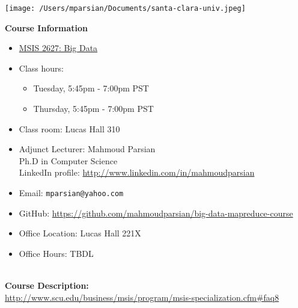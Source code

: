 \documentclass[11pt]{article}
\begin{document}
\texttt{[image: /Users/mparsian/Documents/santa-clara-univ.jpeg]} 
\bigskip
\vspace{10mm}

\textbf {\LARGE Course Information}
\begin{itemize}
	\item \href{http://www.scu.edu/courseavail/class/?fuseaction=details&acad_career=BUSN&subject=MSIS&class_nbr=32603&term=3720}{MSIS 2627: Big Data}
    \item Class hours: 
          \begin{itemize}
              \item Tuesday, 5:45pm - 7:00pm PST
              \item Thursday, 5:45pm - 7:00pm PST
          \end{itemize}   	
    \item Class room: Lucas Hall 310 
	\item Adjunct Lecturer: Mahmoud Parsian \\
	Ph.D in Computer Science \\
	LinkedIn profile: \url{http://www.linkedin.com/in/mahmoudparsian}
	\item Email: \verb#mparsian@yahoo.com# 
	\item GitHub: \url{https://github.com/mahmoudparsian/big-data-mapreduce-course} 
	\item Office Location: Lucas Hall 221X
	\item Office Hours: TBDL 
\end{itemize}

\vspace{5mm}

\textbf {\large \\ Course Description:} \\
\url{http://www.scu.edu/business/msis/program/msis-specialization.cfm#faq8}

\vspace{5mm}
\end{document}
